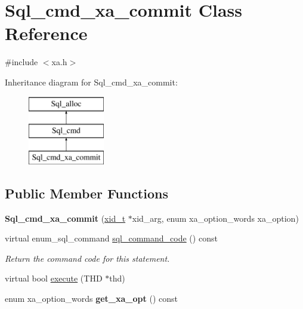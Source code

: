 \hypertarget{classSql__cmd__xa__commit}{}\section{Sql\+\_\+cmd\+\_\+xa\+\_\+commit Class Reference}
\label{classSql__cmd__xa__commit}


{\ttfamily \#include $<$xa.\+h$>$}

Inheritance diagram for Sql\+\_\+cmd\+\_\+xa\+\_\+commit\+:\begin{figure}[H]
\begin{center}
\leavevmode
\includegraphics[height=3.000000cm]{classSql__cmd__xa__commit}
\end{center}
\end{figure}
\subsection*{Public Member Functions}
\begin{DoxyCompactItemize}
\item 
\mbox{\label{classSql__cmd__xa__commit_a04ce90e7dc577b84180ea5218ed18d26}} 
{\bfseries Sql\+\_\+cmd\+\_\+xa\+\_\+commit} (\mbox{\hyperlink{structxid__t}{xid\+\_\+t}} $\ast$xid\+\_\+arg, enum xa\+\_\+option\+\_\+words xa\+\_\+option)
\item 
\mbox{\label{classSql__cmd__xa__commit_a78d03006286a2d6eac61c748efe9c895}} 
virtual enum\+\_\+sql\+\_\+command \mbox{\hyperlink{classSql__cmd__xa__commit_a78d03006286a2d6eac61c748efe9c895}{sql\+\_\+command\+\_\+code}} () const
\begin{DoxyCompactList}\small\item\em Return the command code for this statement. \end{DoxyCompactList}\item 
virtual bool \mbox{\hyperlink{classSql__cmd__xa__commit_a5c883806812b74adc71d7eba693e863a}{execute}} (T\+HD $\ast$thd)
\item 
\mbox{\label{classSql__cmd__xa__commit_a2c828018a3543ff2a1e5c4258b31a002}} 
enum xa\+\_\+option\+\_\+words {\bfseries get\+\_\+xa\+\_\+opt} () const
\end{DoxyCompactItemize}

